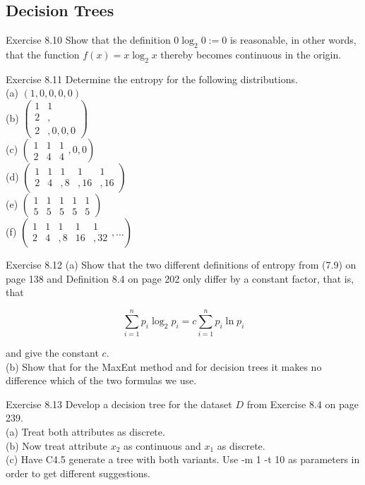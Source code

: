 \documentclass[10pt]{book}
\begin{document}
\subsection{Decision Trees}
Exercise 8.10 Show that the definition $0 \log _{2} 0:=0$ is reasonable, in other words, that the function $f(x)=x \log _{2} x$ thereby becomes continuous in the origin.

Exercise 8.11 Determine the entropy for the following distributions.\\
(a) $(1,0,0,0,0)$\\
(b) $\left(\begin{array}{ll}1 & 1 \\ 2 & , \\ 2 & , 0,0,0\end{array}\right)$\\
(c) $\left(\begin{array}{ccc}1 & 1 & 1 \\ 2 & 4 & 4\end{array}, 0,0\right)$\\
(d) $\left(\begin{array}{ccccc}1 & 1 & 1 & 1 & 1 \\ 2 & 4 & , 8 & , 16 & , 16\end{array}\right)$\\
(e) $\left(\begin{array}{ccccc}1 & 1 & 1 & 1 & 1 \\ 5 & 5 & 5 & 5 & 5\end{array}\right)$\\
(f) $\left(\begin{array}{ccccc}1 & 1 & 1 & 1 & 1 \\ 2 & 4 & , 8 & 16 & , 32\end{array}, \ldots\right)$

Exercise 8.12
(a) Show that the two different definitions of entropy from (7.9) on page 138 and Definition 8.4 on page 202 only differ by a constant factor, that is, that

$$
\sum_{i=1}^{n} p_{i} \log _{2} p_{i}=c \sum_{i=1}^{n} p_{i} \ln p_{i}
$$

and give the constant $c$.\\
(b) Show that for the MaxEnt method and for decision trees it makes no difference which of the two formulas we use.


Exercise 8.13 Develop a decision tree for the dataset $D$ from Exercise 8.4 on page 239.\\
(a) Treat both attributes as discrete.\\
(b) Now treat attribute $x_{2}$ as continuous and $x_{1}$ as discrete.\\
(c) Have C4.5 generate a tree with both variants. Use -m 1 -t 10 as parameters in order to get different suggestions.
\end{document}
